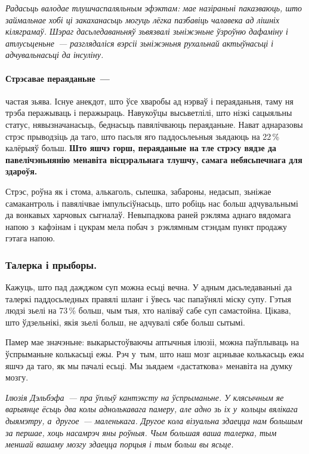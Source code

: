 \emph{Радасьць валодае тлушчаспаляльным эфэктам: мае назіраньні паказваюць, што займальнае хобі ці закаханасьць могуць лёгка пазбавіць чалавека ад лішніх кіляграмаў. Шэраг дасьледаваньняў зьвязвалі зьніжэньне ўзроўню дафаміну і атлусьценьне~--- разглядаліся вэрсіі зьніжэньня рухальнай актыўнасьці і адчувальнасьці да інсуліну.}

\paragraph{Стрэсавае пераяданьне~---} частая зьява. Існуе анекдот, што ўсе хваробы ад нэрваў і пераяданьня, таму ня трэба перажываць і перажыраць. Навукоўцы высьветлілі, што нізкі сацыяльны статус, нявызначанасьць, беднасьць павялічваюць пераяданьне. Нават аднаразовы стрэс прыводзіць да таго, што пасьля яго паддосьлеьныя зьядаюць на 22\,\% калёрыяў больш. \textbf{Што яшчэ горш, пераяданьне на тле стрэсу вядзе да павелічэньнянію менавіта вісцэральнага тлушчу, самага небясьпечнага для здароўя.}

Стрэс, роўна як і стома, алькаголь, сьпешка, забароны, недасып, зьніжае самакантроль і павялічвае імпульсіўнасьць, што робіць нас больш адчувальнымі да вонкавых харчовых сыгналаў. Невыпадкова раней рэкляма аднаго вядомага напою з~кафэінам і цукрам мела побач з~рэклямным стэндам пункт продажу гэтага напою.

\subsubsection{Талерка і прыборы.} 
Кажуць, што пад дажджом суп можна есьці вечна. У адным дасьледаваньні да талеркі паддосьледных правялі шланг і ўвесь час папаўнялі міску супу. Гэтыя людзі зьелі на 73\,\% больш, чым тыя, хто наліваў сабе суп самастойна. Цікава, што ўдзельнікі, якія зьелі больш, не адчувалі сябе больш сытымі. 


Памер мае значэньне: выкарыстоўваючы аптычныя ілюзіі, можна паўплываць на ўспрыманьне колькасьці ежы. Рэч у~тым, што наш мозг ацэньвае колькасьць ежы яшчэ да таго, як мы пачалі есьці. Мы зьядаем «дастаткова» менавіта на думку мозгу.

\emph{Ілюзія Дэльбэфа~--- пра ўплыў кантэксту на ўспрыманьне. У клясычным яе варыянце ёсьць два колы аднолькавага памеру, але адно зь іх у~кольцы вялікага дыямэтру, а~другое~--- маленькага. Другое кола візуальна здаецца нам большым за першае, хоць насамрэч яны роўныя. Чым большая ваша талерка, тым меншай вашаму мозгу здаецца порцыя і тым больш вы ясьце.}

